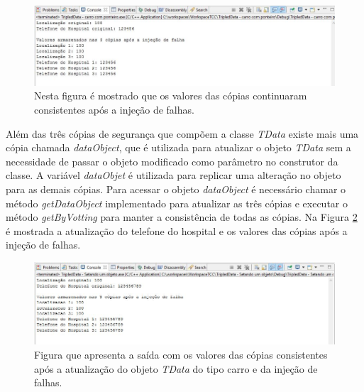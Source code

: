 \begin{figure}[H]
	\centering
	\includegraphics[width=1.0\textwidth]{figuras/tdataPonteiro.jpg}
	\caption[Valores das cópias consistentes após a injeção de falhas com ponteiro.]{Nesta figura é mostrado que os valores das cópias continuaram consistentes após a injeção de falhas.}
	\label{Img:tdataPonteiro}	
\end{figure}

Além das três cópias de segurança que compõem a classe \textit{TData} existe mais uma cópia chamada \textit{dataObject}, que é utilizada para atualizar o objeto \textit{TData} sem a necessidade de passar o objeto modificado como parâmetro no construtor da classe. A variável \textit{dataObjet} é utilizada para replicar uma alteração no objeto para as demais cópias. Para acessar o objeto \textit{dataObject}  é necessário chamar o método \textit{getDataObject} implementado para atualizar as três cópias e executar o método \textit{getByVotting} para manter a consistência de todas as cópias. Na Figura \ref{Img:tdataSetando} é mostrada a atualização do telefone do hospital e os valores das cópias após a injeção de falhas.

\begin{figure}[H]
	\centering
	\includegraphics[width=1.0\textwidth]{figuras/tdataSetando.jpg}
	\caption[Figura que apresenta a saída com os valores das cópias consistentes após a atualização do objeto \textit{TData} do tipo carro e da injeção de falhas.]{Figura que apresenta a saída com os valores das cópias consistentes após a atualização do objeto \textit{TData} do tipo carro e da injeção de falhas.}
	\label{Img:tdataSetando}	
\end{figure}